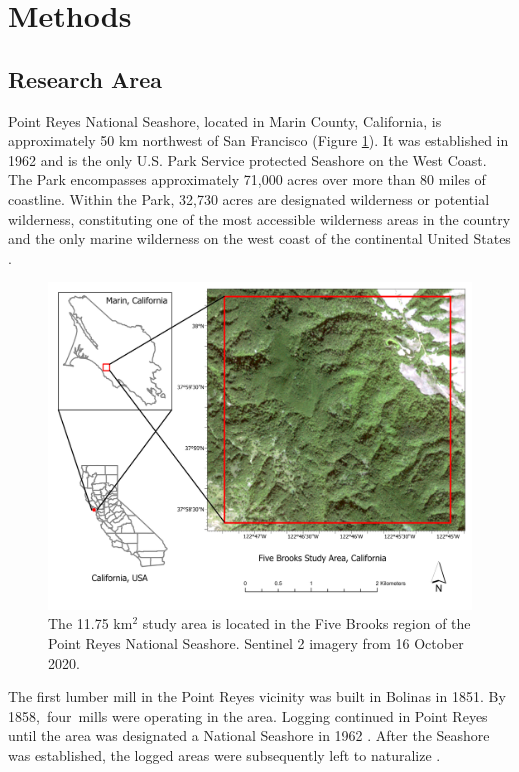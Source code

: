\documentclass[remotesensing,article,accept,pdftex,moreauthors]{Definitions/mdpi}
\begin{document}
\section{Methods}
\subsection{Research Area}

Point Reyes National Seashore, located in Marin County, California, is approximately 50 km northwest of San Francisco (Figure \ref{fig1}). It was established in 1962 and is the only U.S. Park Service protected Seashore on the West Coast. The Park encompasses approximately 71,000 acres over more than 80 miles of coastline. Within the Park, 32,730 acres are designated wilderness or potential wilderness, constituting one of the most accessible wilderness areas in the country and the only marine wilderness on the west coast of the continental United States \cite{council}.  

\begin{figure}[H]	
\includegraphics[width=13.7 cm]{LayoutBrooks.png}
\caption{The 11.75 km$^2$ study area is located in the Five Brooks region of the Point Reyes National Seashore. Sentinel 2 imagery from 16 October 2020. \label{fig1}}
\end{figure}  

The first lumber mill in the Point Reyes vicinity was built in Bolinas in 1851. By 1858,~four~mills were operating in the area. Logging continued in Point Reyes until the area was designated a National Seashore in 1962 \cite{livingston}. After the Seashore was established, the logged areas were subsequently left to naturalize \cite{becker}. 
\end{document}
